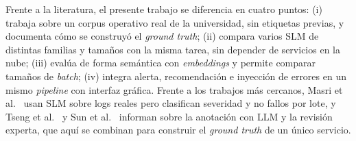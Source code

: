 
Frente a la literatura, el presente trabajo se diferencia en cuatro puntos: (i) trabaja sobre un corpus operativo real de la universidad, sin etiquetas previas, y documenta cómo se construyó el \textit{ground truth}; (ii) compara varios SLM de distintas familias y tamaños con la misma tarea, sin depender de servicios en la nube; (iii) evalúa de forma semántica con \textit{embeddings} y permite comparar tamaños de \textit{batch}; (iv) integra alerta, recomendación e inyección de errores en un mismo \textit{pipeline} con interfaz gráfica. Frente a los trabajos más cercanos, Masri et al.~\cite{masri2026_slm_severity} usan SLM sobre logs reales pero clasifican severidad y no fallos por lote, y Tseng et al.~\cite{tseng2025_expert_annotators} y Sun et al.~\cite{sun2026_parsing} informan sobre la anotación con LLM y la revisión experta, que aquí se combinan para construir el \textit{ground truth} de un único servicio.
